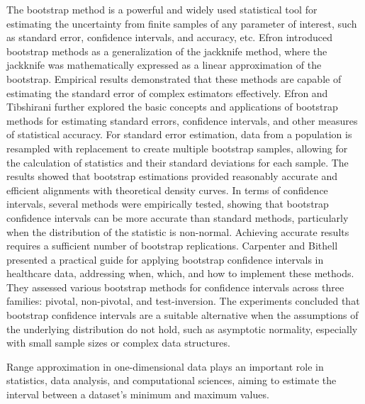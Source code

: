 \documentclass[lettersize,journal]{IEEEtran}
\begin{document}
The bootstrap method is a powerful and widely used statistical tool for estimating the uncertainty from finite samples of any parameter of interest, such as standard error, confidence intervals, and accuracy, etc.  Efron \cite{efron} introduced bootstrap methods as a generalization of the jackknife method, where the jackknife was mathematically expressed as a linear approximation of the bootstrap. Empirical results demonstrated that these methods are capable of estimating the standard error of complex estimators effectively. Efron and Tibshirani \cite{efron2} further explored the basic concepts and applications of bootstrap methods for estimating standard errors, confidence intervals, and other measures of statistical accuracy. For standard error estimation, data from a population is resampled with replacement to create multiple bootstrap samples, allowing for the calculation of statistics and their standard deviations for each sample. The results showed that bootstrap estimations provided reasonably accurate and efficient alignments with theoretical density curves. In terms of confidence intervals, several methods were empirically tested, showing that bootstrap confidence intervals can be more accurate than standard methods, particularly when the distribution of the statistic is non-normal. Achieving accurate results requires a sufficient number of bootstrap replications. Carpenter and Bithell \cite{carpenter} presented a practical guide for applying bootstrap confidence intervals in healthcare data, addressing when, which, and how to implement these methods. They assessed various bootstrap methods for confidence intervals across three families: pivotal, non-pivotal, and test-inversion. The experiments concluded that bootstrap confidence intervals are a suitable alternative when the assumptions of the underlying distribution do not hold, such as asymptotic normality, especially with small sample sizes or complex data structures. 

Range approximation in one-dimensional data plays an important role in statistics, data analysis, and computational sciences, aiming to estimate the interval between a dataset's minimum and maximum values.

\IEEEpubidadjcol



\end{document}
